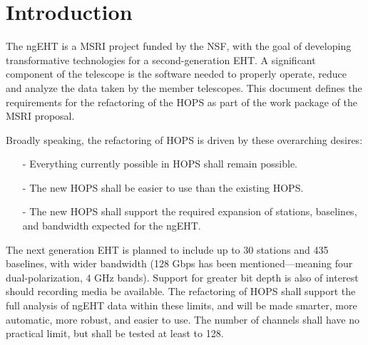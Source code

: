 %
%

\section{Introduction}
\label{sec:intro}


The \ac{ngEHT} is a \ac{MSRI} project funded by the \ac{NSF}, with the goal of developing
transformative technologies for a second-generation \ac{EHT}. A significant
component of the telescope is the software needed to properly
operate, reduce and analyze the data taken by the member telescopes.
This document defines the requirements for the refactoring of the \ac{HOPS}
as part of the work package of the \acs{MSRI} proposal. 

Broadly speaking, the refactoring of \acs{HOPS} is driven by
these overarching desires:

\begin{itemize}
\item[-] Everything currently possible in \ac{HOPS} shall remain possible.

\item[-] The new \ac{HOPS} shall be easier to use than the existing \acs{HOPS}.
 
\item[-] The new \acs{HOPS} shall support the required expansion of stations, 
baselines, and bandwidth expected for the ngEHT.

\end{itemize}

The next generation \acs{EHT} is planned to include up to 30 stations
and 435 baselines, with wider bandwidth (128 Gbps has been mentioned---meaning
four dual-polarization, 4 GHz bands). Support for greater bit depth is
also of interest should recording media be available.  The refactoring
of \ac{HOPS} shall support the full analysis of ngEHT data within these limits,
and will be made smarter, more automatic, more robust, and easier to use. The
number of channels shall have no practical limit, but shall be tested at least to 128.

